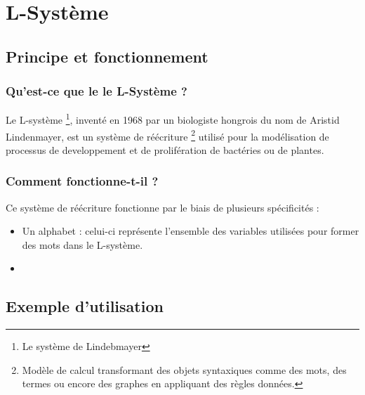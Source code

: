 \chapter{L-Système}

\section{Principe et fonctionnement}

\subsection{Qu'est-ce que le le L-Système ?}
Le L-système \footnote{Le système de Lindebmayer}, inventé en 1968 par un biologiste hongrois du nom de Aristid Lindenmayer, est un système de réécriture \footnote{Modèle de calcul transformant des objets syntaxiques comme des mots, des termes ou encore des graphes en appliquant des règles données.} utilisé pour la modélisation de processus de developpement et de prolifération de bactéries ou de plantes.
\subsection{Comment fonctionne-t-il ?}
Ce système de réécriture fonctionne par le biais de plusieurs spécificités :
\begin{itemize}
    \item Un alphabet : celui-ci représente l'ensemble des variables utilisées pour former des mots dans le L-système.
    \item  
\end{itemize}

\section{Exemple d'utilisation}